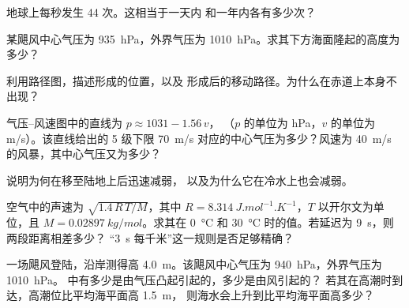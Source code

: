\begin{exercise}[$\star\star$]\label{exo:g10:storms-and-cyclones:7}
地球上每秒发生 44 次。这相当于一天内
和一年内各有多少次？
\end{exercise}

\begin{exercise}[$\star\star$]\label{exo:g10:storms-and-cyclones:8}
某飓风中心气压为 \qty{935}{hPa}，外界气压为
\qty{1010}{hPa}。求其下方海面隆起的高度为多少？
\end{exercise}

\begin{exercise}[$\star\star$]\label{exo:g10:storms-and-cyclones:9}
利用路径图，描述形成的位置，以及
形成后的移动路径。为什么在赤道上本身不出现？
\end{exercise}

\begin{exercise}[$\star\star$]\label{exo:g10:storms-and-cyclones:10}
气压–风速图中的直线为 $p \approx 1031 - 1.56\,v$，
（$p$ 的单位为 \unit{hPa}，$v$ 的单位为 \unit{m/s}）。该直线给出的
5 级下限 \qty{70}{m/s} 对应的中心气压为多少？风速为
\qty{40}{m/s} 的风暴，其中心气压又为多少？
\end{exercise}

\begin{exercise}[$\star\star$]\label{exo:g10:storms-and-cyclones:11}
说明为何在移至陆地上后迅速减弱，
以及为什么它在冷水上也会减弱。
\end{exercise}

\begin{exercise}[$\star\star\star$]\label{exo:g10:storms-and-cyclones:12}
空气中的声速为 $\sqrt{1.4\,R\,T/M}$，其中 $R =
\qty{8.314}{J.mol^{-1}.K^{-1}}$，$T$ 以开尔文为单位，且 $M =
\qty{0.02897}{kg/mol}$。求其在 \qty{0}{\degreeCelsius} 和
\qty{30}{\degreeCelsius} 时的值。若延迟为 \qty{9}{s}，则两段距离相差多少？
“\qty{3}{s} 每千米”这一规则是否足够精确？
\end{exercise}

\begin{exercise}[$\star\star\star$]\label{exo:g10:storms-and-cyclones:13}
一场飓风登陆，沿岸测得高 \qty{4.0}{m}。该飓风中心气压为
\qty{940}{hPa}，外界气压为 \qty{1010}{hPa}。
中有多少是由气压凸起引起的，多少是由风引起的？
若其在高潮时到达，高潮位比平均海平面高 \qty{1.5}{m}，
则海水会上升到比平均海平面高多少？
\end{exercise}

